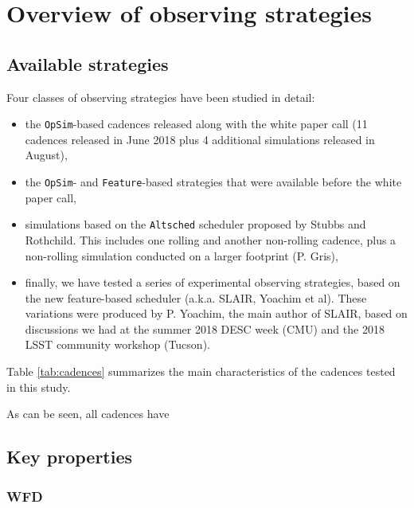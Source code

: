 \documentclass [11pt,a4paper]{article}
\begin{document}
\section{Overview of observing strategies}

\subsection{Available strategies}

Four classes of observing strategies have been studied in detail:
\begin{itemize}

\item the {\tt OpSim}-based cadences released along with the white
  paper call (11 cadences released in June 2018 plus 4 additional
  simulations released in August), 
  
\item the {\tt OpSim}- and {\tt Feature}-based strategies that were
  available before the white paper call, 

\item simulations based on the {\tt Altsched} scheduler proposed by
  Stubbs and Rothchild.  This includes one rolling and another
  non-rolling cadence, plus a non-rolling simulation conducted on a
  larger footprint (P. Gris),

\item finally, we have tested a series of experimental observing
  strategies, based on the new feature-based scheduler (a.k.a.  SLAIR,
  Yoachim et al). These variations were produced by P. Yoachim, the
  main author of SLAIR, based on discussions we had at the summer 2018
  DESC week (CMU) and the 2018 LSST community workshop (Tucson).
\end{itemize}

Table \ref{tab:cadences} summarizes the main characteristics of the
cadences tested in this study.  


As can be seen, all cadences have




\subsection{Key properties}

\subsubsection {WFD}

\end{document}
